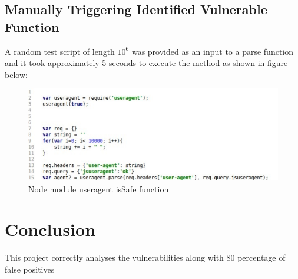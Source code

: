 \documentclass[authoryear,preprint]{sigplanconf}
\begin{document}
\subsection{Manually Triggering Identified Vulnerable Function}

A random test script of length  \begin{math}10^{6} \end{math} was provided as an input to a parse function and it took approximately 5 seconds to execute the method as shown in figure below:

\begin{figure}[ht]
\centering
\includegraphics[width=1\linewidth]{figures/useragent-manual-invoking}
\caption[Node module useragent isSafe function]{\label{f:invoking}Node module useragent isSafe function}
\end{figure}

\section{Conclusion}

This project correctly analyses the vulnerabilities along with 80 percentage  of false positives   

\citep{Aho86-Compilers}

\end{document}
